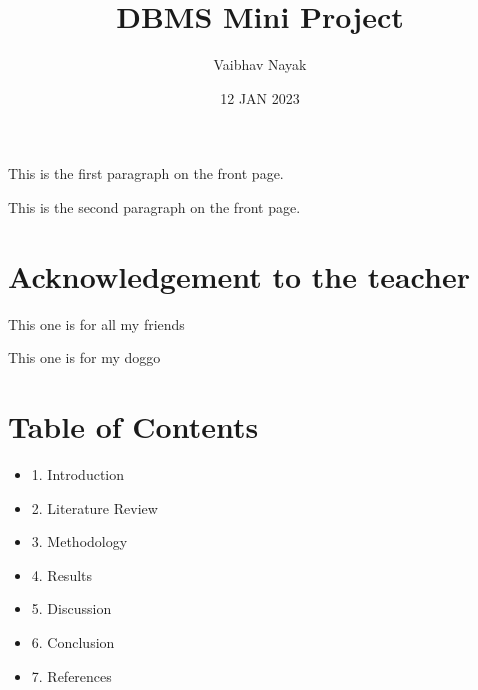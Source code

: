 \documentclass{article}
\begin{document}
\newpage
\title{DBMS Mini Project}
\author{Vaibhav Nayak}
\date{12 JAN 2023}
This is the first paragraph on the front page.\par
This is the second paragraph on the front page.\par

\newpage
\section{Acknowledgement to the teacher}
This one is for all my friends\par
This one is for my doggo\par

\newpage
\section{Table of Contents}
\begin{itemize}
\item 1. Introduction
\item 2. Literature Review
\item 3. Methodology
\item 4. Results
\item 5. Discussion
\item 6. Conclusion
\item 7. References
\end{itemize}
\end{document}
